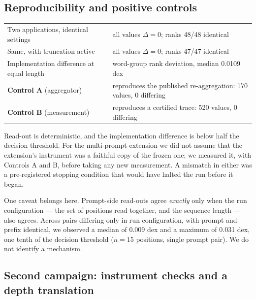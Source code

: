 \documentclass[11pt]{article}
\begin{document}
\subsection{Reproducibility and positive controls}

\begin{center}
\small
\begin{tabular}{@{}ll@{}}
\toprule
Two applications, identical settings & all values $\Delta = 0$; ranks 48/48 identical \\
Same, with truncation active & all values $\Delta = 0$; ranks 47/47 identical \\
Implementation difference at equal length & word-group rank deviation, median 0.0109 dex \\
\textbf{Control A} (aggregator) & reproduces the published re-aggregation: 170 values, 0 differing \\
\textbf{Control B} (measurement) & reproduces a certified trace: 520 values, 0 differing \\
\bottomrule
\end{tabular}
\end{center}

Read-out is deterministic, and the implementation difference is below
half the decision threshold. For the multi-prompt extension we did not
assume that the extension's instrument was a faithful copy of the frozen
one; we measured it, with Controls A and B, before taking any new
measurement. A mismatch in either was a pre-registered stopping condition
that would have halted the run before it began.

One caveat belongs here. Prompt-side read-outs agree \emph{exactly} only
when the run configuration --- the set of positions read together, and
the sequence length --- also agrees. Across pairs differing only in run
configuration, with prompt and prefix identical, we observed a median of
0.009 dex and a maximum of 0.031 dex, one tenth of the decision threshold
($n = 15$ positions, single prompt pair). We do not identify a mechanism.

\subsection{Second campaign: instrument checks and a depth translation}

\label{sec:campaign2}
\end{document}
